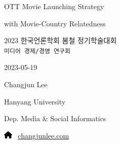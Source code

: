 \documentclass[
  ignorenonframetext,
]{beamer}
\author{}
\date{}
\begin{document}
\ifdefined\Shaded\renewenvironment{Shaded}{\begin{tcolorbox}[borderline west={3pt}{0pt}{shadecolor}, enhanced, sharp corners, interior hidden, frame hidden, boxrule=0pt, breakable]}{\end{tcolorbox}}\fi

\begin{frame}[fragile]
OTT Movie Launching Strategy

with Movie-Country Relatedness

2023 한국언론학회 봄철 정기학술대회\\
\texttt{미디어\ 경제/경영\ 연구회}

2023-05-19

Changjun Lee

Hanyang University

Dep. Media \& Social Informatics

\includegraphics[width=1.12em,height=1em]{index_files/figure-beamer/fa-icon-9de8c0f3cb50e30659d3ab543abf8bca.pdf}
~\href{https://changjunlee.com/}{changjunlee.com}
\end{frame}
\end{document}
